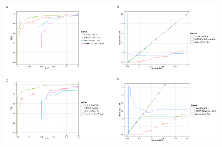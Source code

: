 \documentclass[12pt,oupdraft]{biostatistics}
\begin{document}
\begin{figure} %
   \centering
   \includegraphics{TIKZFig3.eps}

\end{figure}
\end{document}

